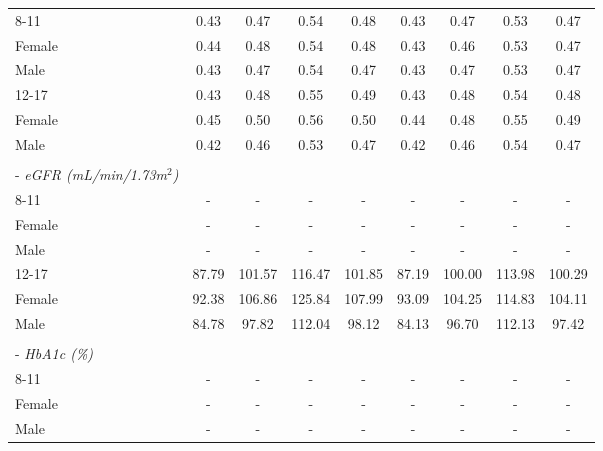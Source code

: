 \documentclass[12pt,leqno,titlepage]{amsart}
\newcommand{\1}{\mathbbm{1}}
\begin{document}
\begin{bibunit}
\begin{table}[!t]
\begin{tabular*}{\linewidth}{@{\extracolsep{\fill}}lcccc|cccc@{}}
\hspace*{2.2em}8-11 & 0.43 & 0.47 & 0.54 & 0.48 & 0.43 & 0.47 & 0.53 & 0.47 \\
\hspace*{4.4em}Female & 0.44 & 0.48 & 0.54 & 0.48 & 0.43 & 0.46 & 0.53 & 0.47 \\
\hspace*{4.4em}Male & 0.43 & 0.47 & 0.54 & 0.47 & 0.43 & 0.47 & 0.53 & 0.47 \\
\hspace*{2.2em}12-17 & 0.43 & 0.48 & 0.55 & 0.49 & 0.43 & 0.48 & 0.54 & 0.48 \\
\hspace*{4.4em}Female & 0.45 & 0.50 & 0.56 & 0.50 & 0.44 & 0.48 & 0.55 & 0.49 \\
\hspace*{4.4em}Male & 0.42 & 0.46 & 0.53 & 0.47 & 0.42 & 0.46 & 0.54 & 0.47 \\
\rule{0pt}{1.1em} & & & & & & & & \\
\hspace*{0.8em}- \textit{eGFR (mL/min/1.73m$^2$)} & & & & & & & & \\
\hspace*{2.2em}8-11 & - & - & - & - & - & - & - & - \\
\hspace*{4.4em}Female & - & - & - & - & - & - & - & - \\
\hspace*{4.4em}Male & - & - & - & - & - & - & - & - \\
\hspace*{2.2em}12-17 & 87.79 & 101.57 & 116.47 & 101.85 & 87.19 & 100.00 & 113.98 & 100.29 \\
\hspace*{4.4em}Female & 92.38 & 106.86 & 125.84 & 107.99 & 93.09 & 104.25 & 114.83 & 104.11 \\
\hspace*{4.4em}Male & 84.78 & 97.82 & 112.04 & 98.12 & 84.13 & 96.70 & 112.13 & 97.42 \\
\rule{0pt}{1.1em} & & & & & & & & \\
\hspace*{0.8em}- \textit{HbA1c (\%)} & & & & & & & & \\
\hspace*{2.2em}8-11 & - & - & - & - & - & - & - & - \\
\hspace*{4.4em}Female & - & - & - & - & - & - & - & - \\
\hspace*{4.4em}Male & - & - & - & - & - & - & - & - \\

\end{tabular*}
\end{table}
\end{bibunit}
\end{document}

